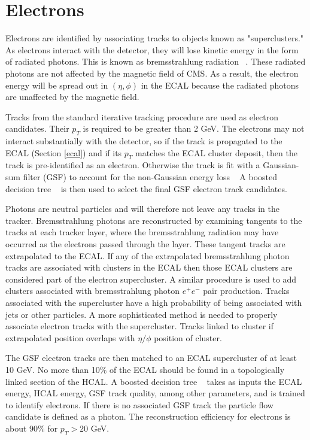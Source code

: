 \documentclass[oneside, letterpaper, oldfontcommands]{memoir}
\begin{document}
\section{Electrons}\label{electrons}

\qquad Electrons are identified by associating tracks to objects known as "superclusters." As electrons interact with the detector, they will lose kinetic energy in the form of radiated photons. This is known as bremsstrahlung radiation ~\cite{griffiths1999introduction}. These radiated photons are not affected by the magnetic field of CMS. As a result, the electron energy will be spread out in $(\eta,\phi)$ in the ECAL because the radiated photons are unaffected by the magnetic field. 

\qquad Tracks from the standard iterative tracking procedure are used as electron candidates. Their $p_{T}$ is required to be greater than 2 GeV. The electrons may not interact substantially with the detector, so if the track is propagated to the ECAL (Section \ref{ecal}) and if its $p_{T}$ matches the ECAL cluster deposit, then the track is pre-identified as an electron. Otherwise the track is fit with a Gaussian-sum filter (GSF) to account for the non-Gaussian energy loss ~\cite{Adam:815410} A boosted decision tree ~\cite{Hocker:2007ht} is then used to select the final GSF electron track candidates.  

\qquad Photons are neutral particles and will therefore not leave any tracks in the tracker. Bremsstrahlung photons are reconstructed by examining tangents to the tracks at each tracker layer, where the bremsstrahlung radiation may have occurred as the electrons passed through the layer. These tangent tracks are extrapolated to the ECAL. If any of the extrapolated bremsstrahlung photon tracks are associated with clusters in the ECAL then those ECAL clusters are considered part of the electron supercluster. A similar procedure is used to add clusters associated with bremsstrahlung photon $e^{+}e^{-}$ pair production. Tracks associated with the supercluster have a high probability of being associated with jets or other particles. A more sophisticated method is needed to properly associate electron tracks with the supercluster. Tracks linked to cluster if extrapolated position overlaps with $\eta/\phi$ position of cluster.

\qquad The GSF electron tracks are then matched to an ECAL supercluster of at least 10 GeV. No more than 10$\%$ of the ECAL should be found in a topologically linked section of the HCAL. A boosted decision tree ~\cite{Hocker:2007ht} takes as inputs the ECAL energy, HCAL energy, GSF track quality, among other parameters, and is trained to identify electrons. If there is no associated GSF track the particle flow candidate is defined as a photon. The reconstruction efficiency for electrons is about 90$\%$ for $p_{T} > 20$ GeV. ~\cite{Khachatryan:2015hwa}
\end{document}
